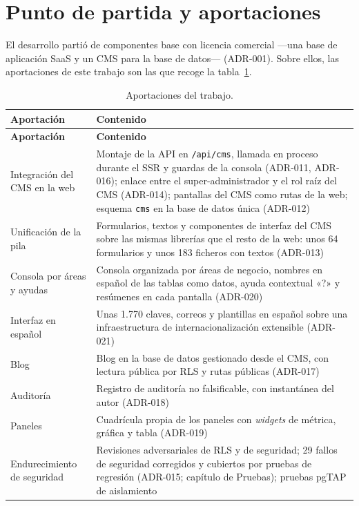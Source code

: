 \section{Punto de partida y aportaciones}
\label{sec:imp-reutilizacion}

El desarrollo partió de componentes base con licencia comercial ---una base de
aplicación SaaS y un CMS para la base de datos--- (ADR-001). Sobre ellos, las
aportaciones de este trabajo son las que recoge la
tabla~\ref{tab:imp-reutilizacion}.

\begin{longtable}{@{}>{\raggedright\arraybackslash}p{4.2cm}>{\raggedright\arraybackslash}p{10.0cm}@{}}
  \caption{Aportaciones del trabajo.}\label{tab:imp-reutilizacion}\\
  \toprule
  \textbf{Aportación} & \textbf{Contenido} \\
  \midrule
  \endfirsthead
  \toprule
  \textbf{Aportación} & \textbf{Contenido} \\
  \midrule
  \endhead
  \bottomrule
  \endfoot
  Integración del CMS en la web & Montaje de la API en \texttt{/api/cms}, llamada en proceso durante el SSR y guardas de la consola (ADR-011, ADR-016); enlace entre el super-administrador y el rol raíz del CMS (ADR-014); pantallas del CMS como rutas de la web; esquema \texttt{cms} en la base de datos única (ADR-012) \\
  Unificación de la pila & Formularios, textos y componentes de interfaz del CMS sobre las mismas librerías que el resto de la web: unos 64 formularios y unos 183 ficheros con textos (ADR-013) \\
  Consola por áreas y ayudas & Consola organizada por áreas de negocio, nombres en español de las tablas como datos, ayuda contextual «?» y resúmenes en cada pantalla (ADR-020) \\
  Interfaz en español & Unas 1.770 claves, correos y plantillas en español sobre una infraestructura de internacionalización extensible (ADR-021) \\
  Blog & Blog en la base de datos gestionado desde el CMS, con lectura pública por RLS y rutas públicas (ADR-017) \\
  Auditoría & Registro de auditoría no falsificable, con instantánea del autor (ADR-018) \\
  Paneles & Cuadrícula propia de los paneles con \textit{widgets} de métrica, gráfica y tabla (ADR-019) \\
  Endurecimiento de seguridad & Revisiones adversariales de RLS y de seguridad; 29 fallos de seguridad corregidos y cubiertos por pruebas de regresión (ADR-015; capítulo de Pruebas); pruebas pgTAP de aislamiento \\

\end{longtable}
